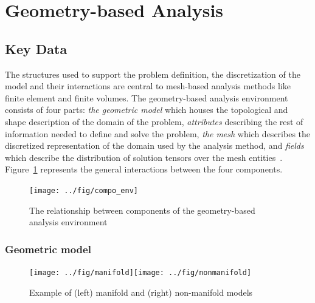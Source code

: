 \section{Geometry-based Analysis}\label{sec:2}

\subsection{Key Data}

The structures used to support the problem definition, the discretization of the
model and their interactions are central to mesh-based analysis methods like
finite element and finite volumes.  The geometry-based analysis environment consists of four parts: \emph{the geometric model} which houses the topological and shape description of the domain of the problem,
\emph{attributes} describing the rest of information needed to define and solve the
problem, \emph{the mesh} which describes the discretized representation of the
domain used by the analysis method, and \emph{fields} which describe the
distribution of solution tensors over the mesh entities~\cite{beallthesis, simmetrixweb}.
Figure~\ref{fig:compo} represents the general interactions between the four
components. 

\begin{figure}
\centering
\texttt{[image: ../fig/compo\_env]}
\caption[The relationship between components of the geometry-based analysis environment]
{The relationship between components of the geometry-based analysis environment~\cite{beallthesis}}
\label{fig:compo}  %
\end{figure}

\subsubsection{Geometric model}

\begin{figure}
\centering
\texttt{[image: ../fig/manifold]}\hspace{.5in}\texttt{[image: ../fig/nonmanifold]}
\caption[Example of manifold and non-manifold models]
{Example of (left) manifold and (right) non-manifold models}
\label{fig:nonmanifold}  %
\end{figure}

